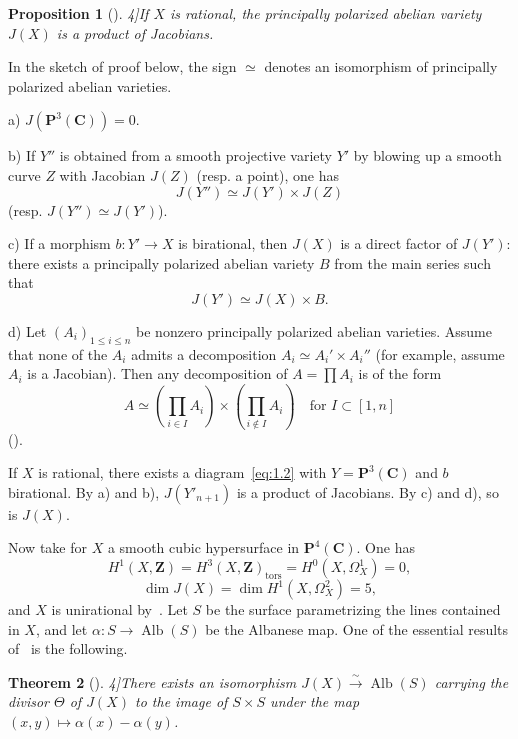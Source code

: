 \documentclass[12pt]{amsart}
\theoremstyle{plain}
\newtheorem{theorem}{Theorem}[section]
\newtheorem{proposition}[theorem]{Proposition}
\theoremstyle{definition}
\theoremstyle{remark}
\DeclareMathOperator{\Alb}{Alb}
\begin{document}
\begin{proposition}[\cite[3.26]{4}]\label{prop:2.3}
If $X$ is rational, the principally polarized abelian variety $J(X)$ is a product
of Jacobians.
\end{proposition}

In the sketch of proof below, the sign $\simeq$ denotes an isomorphism of
principally polarized abelian varieties.

\smallskip
\noindent a) $J(\mathbf P^3(\mathbf C))=0$.

\smallskip
\noindent b) If $Y''$ is obtained from a smooth projective variety $Y'$ by blowing
up a smooth curve $Z$ with Jacobian $J(Z)$ (resp. a point), one has
\cite[3.11]{4}
\[
J(Y'')\simeq J(Y')\times J(Z)
\]
(resp. $J(Y'')\simeq J(Y')$).

\smallskip
\noindent c) If a morphism $b\colon Y'\to X$ is birational, then $J(X)$ is a
direct factor of $J(Y')$: there exists a principally polarized abelian variety $B$
from the main series such that
\[
J(Y')\simeq J(X)\times B.
\]

\smallskip
\noindent d) Let $(A_i)_{1\leqslant i\leqslant n}$ be nonzero principally polarized
abelian varieties. Assume that none of the $A_i$ admits a decomposition
$A_i\simeq A_i'\times A_i''$ (for example, assume $A_i$ is a Jacobian). Then any
decomposition of $A=\prod A_i$ is of the form
\[
A\simeq \left(\prod_{i\in I}A_i\right)\times \left(\prod_{i\notin I}A_i\right)
\quad\text{for } I\subset [1,n]
\]
(\cite[3.23]{4}).

If $X$ is rational, there exists a diagram~\eqref{eq:1.2} with
$Y=\mathbf P^3(\mathbf C)$ and $b$ birational. By a) and b),
$J(Y'_{n+1})$ is a product of Jacobians. By c) and d), so is $J(X)$.

Now take for $X$ a smooth cubic hypersurface in $\mathbf P^4(\mathbf C)$. One has
\[
H^1(X,\mathbf Z)=H^3(X,\mathbf Z)_{\mathrm{tors}}=H^0(X,\Omega_X^1)=0,
\]
\[
\dim J(X)=\dim H^1(X,\Omega_X^2)=5,
\]
and $X$ is unirational by~\cite{7}. Let $S$ be the surface parametrizing the
lines contained in $X$, and let $\alpha\colon S\to\Alb(S)$ be the Albanese map.
One of the essential results of~\cite{4} is the following.

\begin{theorem}[\cite[11.19 and 13.4]{4}]\label{thm:2.4}
There exists an isomorphism $J(X)\xrightarrow{\sim}\Alb(S)$ carrying the
divisor $\Theta$ of $J(X)$ to the image of $S\times S$ under the map
$(x,y)\mapsto \alpha(x)-\alpha(y)$.
\end{theorem}
\end{document}
